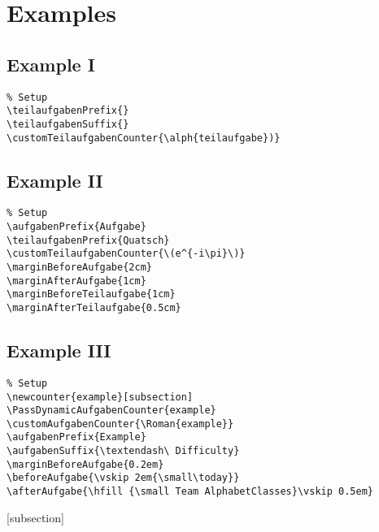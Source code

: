 \documentclass{ctext}
\newenvironment{example}{\begin{figure}[H]\centering\begin{minipage}{.95\textwidth}}{\end{minipage}\end{figure}\vfill\pagebreak}
\begin{document}
\section{Examples}
\subsection{Example I}
\begin{verbatim}
% Setup
\teilaufgabenPrefix{}
\teilaufgabenSuffix{}
\customTeilaufgabenCounter{\alph{teilaufgabe})}
\end{verbatim}
\teilaufgabenPrefix{}
\teilaufgabenSuffix{}
\begin{example}
  \aufgabe{}
  \teilaufgabe{}
  \lipsum[1]
\end{example}
\ResetAll
\subsection{Example II}
\begin{verbatim}
% Setup
\aufgabenPrefix{Aufgabe}
\teilaufgabenPrefix{Quatsch}
\customTeilaufgabenCounter{\(e^{-i\pi}\)}
\marginBeforeAufgabe{2cm}
\marginAfterAufgabe{1cm}
\marginBeforeTeilaufgabe{1cm}
\marginAfterTeilaufgabe{0.5cm}
\end{verbatim}
\marginBeforeAufgabe{1cm}
\marginAfterAufgabe{1em}
\marginBeforeTeilaufgabe{0.5cm}
\marginAfterTeilaufgabe{0.5em}
\begin{example}
  \aufgabe{}
  \lipsum[1]
  \teilaufgabe{}
  \lipsum[2]
  \teilaufgabe{}
  \lipsum[3-4]
  \teilaufgabe{}
  \lipsum[5]
\end{example}
\ResetAll
\subsection{Example III}
\begin{verbatim}
% Setup
\newcounter{example}[subsection]
\PassDynamicAufgabenCounter{example}
\customAufgabenCounter{\Roman{example}}
\aufgabenPrefix{Example}
\aufgabenSuffix{\textendash\ Difficulty}
\marginBeforeAufgabe{0.2em}
\beforeAufgabe{\vskip 2em{\small\today}}
\afterAufgabe{\hfill {\small Team AlphabetClasses}\vskip 0.5em}
\end{verbatim}
[subsection]
\marginBeforeAufgabe{0.2em}
\beforeAufgabe{\vskip 2em{\small\today}}
\begin{example}
  \lipsum[1]
  \lipsum[2]
  \lipsum[3]
\end{example}
\ResetAll
\end{document}
